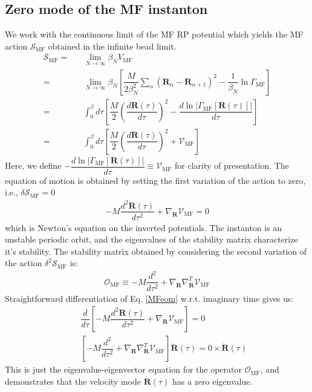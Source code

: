 \documentclass[%
 aip,
 jmp,%
 amsmath,amssymb,
reprint,%
]{revtex4-1}
\begin{document}
\begin{appendices}
\section{\label{sec:AppendA} Zero mode of the MF instanton}
We work with the continuous limit of the MF RP potential which yields the MF action $\mathcal{S}_{\mathrm{MF}}$ obtained in the infinite bead limit. 
\begin{eqnarray}
\mathcal{S}_{\mathrm{MF}} = && \lim_{N\rightarrow\infty}\beta_{N}V_{\mathrm{MF}} \nonumber \\
= && \lim_{N\rightarrow\infty} \beta_{N}\left[ \dfrac{M}{2\beta_{N}^2}\sum_{\alpha} (\mathbf{R}_{\alpha} - \mathbf{R}_{\alpha+1})^2 - \dfrac{1}{\beta_{N}} \ln \Gamma_{\mathrm{MF}} \right]\nonumber \\
 = && \int_{0}^{\beta} d\tau \left[ \dfrac{M}{2}\left( \dfrac{d \mathbf{R}(\tau)}{d\tau}\right)^2 - \dfrac{d \ln| \Gamma_{\mathrm{MF}}[\mathbf{R}(\tau)]| }{d\tau}  \right] \nonumber \\
 = && \int_{0}^{\beta} d\tau \left[ \dfrac{M}{2}\left( \dfrac{d \mathbf{R}(\tau)}{d\tau}\right)^2 + \mathcal{V}_\mathrm{{MF}}\right] 
\end{eqnarray}
Here, we define $ -\dfrac{d \ln |\Gamma_{\mathrm{MF}}[\mathbf{R}(\tau)] |}{d\tau} \equiv \mathcal{V}_\mathrm{{MF}}$ for clarity of  presentation.
The equation of motion is obtained by setting the first variation of the action to zero, i.e., $\delta \mathcal{S}_{\mathrm{MF}} = 0$
\begin{eqnarray}
- M \dfrac{d^2 \mathbf{R}(\tau)}{d\tau^2} + \nabla_{\mathbf{R}} \mathcal{V}_\mathrm{{MF}} = 0 \label{MFeom} 
\end{eqnarray}
which is Newton's equation on the inverted potentials. The instanton is an unstable periodic orbit, and the eigenvalues of the stability matrix characterize it's stability. The stability matrix obtained by considering the second variation of the action $\delta^2 \mathcal{S}_{\mathrm{MF}}$ is:
\begin{eqnarray}
\mathcal{O}_{\mathrm{MF}} \equiv - M\dfrac{d^2}{d\tau^2} + \nabla_{\mathbf{R}}\nabla_{\mathbf{R}}^{T}\mathcal{V}_\mathrm{{MF}} 
\end{eqnarray}
Straightforward differentiation of Eq. \eqref{MFeom} w.r.t. imaginary time gives us:
\begin{eqnarray}
&& \dfrac{d}{d\tau} \left[ - M \dfrac{d^2 \mathbf{R}(\tau)}{d\tau^2} + \nabla_{\mathbf{R}}\mathcal{V}_\mathrm{{MF}}  \right] = 0  \nonumber \\
&& \left[ - M \dfrac{d^2 }{d\tau^2} + \nabla_{\mathbf{R}}\nabla_{\mathbf{R}}^{T}\mathcal{V}_\mathrm{{MF}} \right] \dot{\mathbf{R}}(\tau) = 0 \times \dot{\mathbf{R}}(\tau) 
\end{eqnarray}
This is just the eigenvalue-eigenvector equation for the operator $\mathcal{O}_{\mathrm{MF}}$, and demonstrates that the velocity mode $\dot{\mathbf{R}}(\tau)$ has a zero eigenvalue. 

\end{appendices}
\end{document}
